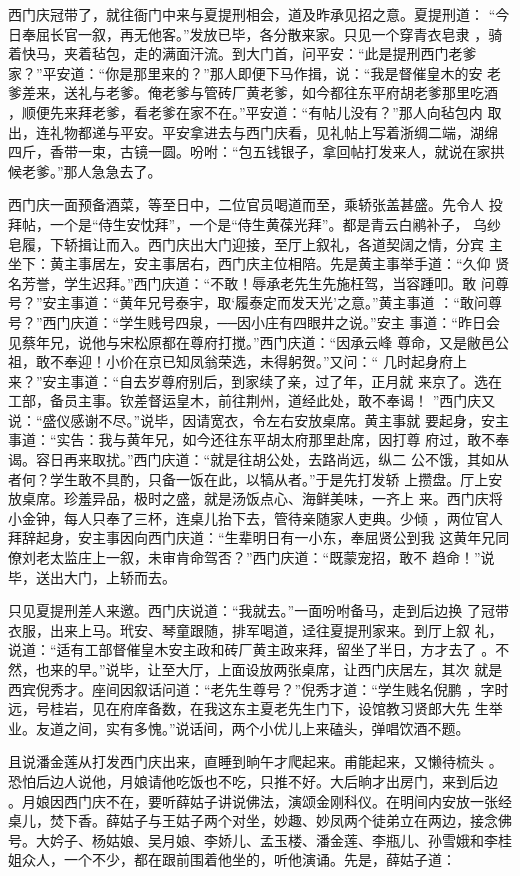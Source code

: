 西门庆冠带了，就往衙门中来与夏提刑相会，道及昨承见招之意。夏提刑道：
“今日奉屈长官一叙，再无他客。”发放已毕，各分散来家。只见一个穿青衣皂隶
，骑着快马，夹着毡包，走的满面汗流。到大门首，问平安：“此是提刑西门老爹
家？”平安道：“你是那里来的？”那人即便下马作揖，说：“我是督催皇木的安
老爹差来，送礼与老爹。俺老爹与管砖厂黄老爹，如今都往东平府胡老爹那里吃酒
，顺便先来拜老爹，看老爹在家不在。”平安道：“有帖儿没有？”那人向毡包内
取出，连礼物都递与平安。平安拿进去与西门庆看，见礼帖上写着浙绸二端，湖绵
四斤，香带一束，古镜一圆。吩咐：“包五钱银子，拿回帖打发来人，就说在家拱
候老爹。”那人急急去了。

西门庆一面预备酒菜，等至日中，二位官员喝道而至，乘轿张盖甚盛。先令人
投拜帖，一个是“侍生安忱拜”，一个是“侍生黄葆光拜”。都是青云白鹇补子，
乌纱皂履，下轿揖让而入。西门庆出大门迎接，至厅上叙礼，各道契阔之情，分宾
主坐下：黄主事居左，安主事居右，西门庆主位相陪。先是黄主事举手道：“久仰
贤名芳誉，学生迟拜。”西门庆道：“不敢！辱承老先生先施枉驾，当容踵叩。敢
问尊号？”安主事道：“黄年兄号泰宇，取‘履泰定而发天光’之意。”黄主事道
：“敢问尊号？”西门庆道：“学生贱号四泉，──因小庄有四眼井之说。”安主
事道：“昨日会见蔡年兄，说他与宋松原都在尊府打搅。”西门庆道：“因承云峰
尊命，又是敝邑公祖，敢不奉迎！小价在京已知凤翁荣选，未得躬贺。”又问：“
几时起身府上来？”安主事道：“自去岁尊府别后，到家续了亲，过了年，正月就
来京了。选在工部，备员主事。钦差督运皇木，前往荆州，道经此处，敢不奉谒！
”西门庆又说：“盛仪感谢不尽。”说毕，因请宽衣，令左右安放桌席。黄主事就
要起身，安主事道：“实告：我与黄年兄，如今还往东平胡太府那里赴席，因打尊
府过，敢不奉谒。容日再来取扰。”西门庆道：“就是往胡公处，去路尚远，纵二
公不饿，其如从者何？学生敢不具酌，只备一饭在此，以犒从者。”于是先打发轿
上攒盘。厅上安放桌席。珍羞异品，极时之盛，就是汤饭点心、海鲜美味，一齐上
来。西门庆将小金钟，每人只奉了三杯，连桌儿抬下去，管待亲随家人吏典。少倾
，两位官人拜辞起身，安主事因向西门庆道：“生辈明日有一小东，奉屈贤公到我
这黄年兄同僚刘老太监庄上一叙，未审肯命驾否？”西门庆道：“既蒙宠招，敢不
趋命！”说毕，送出大门，上轿而去。

只见夏提刑差人来邀。西门庆说道：“我就去。”一面吩咐备马，走到后边换
了冠带衣服，出来上马。玳安、琴童跟随，排军喝道，迳往夏提刑家来。到厅上叙
礼，说道：“适有工部督催皇木安主政和砖厂黄主政来拜，留坐了半日，方才去了
。不然，也来的早。”说毕，让至大厅，上面设放两张桌席，让西门庆居左，其次
就是西宾倪秀才。座间因叙话问道：“老先生尊号？”倪秀才道：“学生贱名倪鹏
，字时远，号桂岩，见在府庠备数，在我这东主夏老先生门下，设馆教习贤郎大先
生举业。友道之间，实有多愧。”说话间，两个小优儿上来磕头，弹唱饮酒不题。

且说潘金莲从打发西门庆出来，直睡到晌午才爬起来。甫能起来，又懒待梳头
。恐怕后边人说他，月娘请他吃饭也不吃，只推不好。大后晌才出房门，来到后边
。月娘因西门庆不在，要听薛姑子讲说佛法，演颂金刚科仪。在明间内安放一张经
桌儿，焚下香。薛姑子与王姑子两个对坐，妙趣、妙凤两个徒弟立在两边，接念佛
号。大妗子、杨姑娘、吴月娘、李娇儿、孟玉楼、潘金莲、李瓶儿、孙雪娥和李桂
姐众人，一个不少，都在跟前围着他坐的，听他演诵。先是，薛姑子道：

